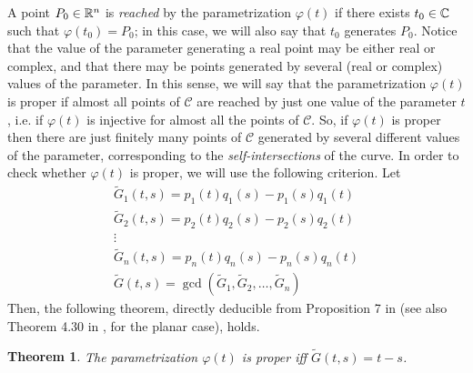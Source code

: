 \documentclass{elsart}
\newtheorem{theorem}{{\bf Theorem}}
\begin{document}
A point $P_0\in {\Bbb R}^n$ is {\it reached} by the
parametrization $\varphi(t)$ if there exists $t_0\in {\Bbb C}$
such that $\varphi(t_0)=P_0$; in this case, we will also say that
$t_0$ generates $P_0$. Notice that the value of the parameter
generating a real point may be either real or complex, and that
there may be points generated by several (real or complex) values
of the parameter. In this sense, we will say that the
parametrization $\varphi(t)$ is {\sf proper} if almost all points
of ${\mathcal C}$ are reached by just one value of the parameter
$t$, i.e. if $\varphi(t)$ is injective for almost all the points
of ${\mathcal C}$. So, if $\varphi(t)$ is proper then there are
just finitely many points of ${\mathcal C}$ generated by several
different values of the parameter, corresponding to the {\it
self-intersections} of the curve. In order to check whether
$\varphi(t)$ is proper, we will use the following criterion. Let
\[
\begin{array}{c}
\tilde{G}_1(t,s)=p_1(t)q_1(s)-p_1(s)q_1(t)\\
\tilde{G}_2(t,s)=p_2(t)q_2(s)-p_2(s)q_2(t)\\
\vdots \\
\tilde{G}_n(t,s)=p_n(t)q_n(s)-p_n(s)q_n(t)\\
\tilde{G}(t,s)=\gcd(\tilde{G}_1,\tilde{G}_2,\ldots,\tilde{G}_n)
\end{array}
\]
Then, the following theorem, directly deducible from Proposition 7
in \cite{Rubio} (see also Theorem 4.30 in \cite{SWPD}, for the
planar case), holds.

\begin{theorem} \label{th-charact-proper}
The parametrization $\varphi(t)$ is proper iff $\tilde{G}(t,s)=t-s$.
\end{theorem}
\end{document}
